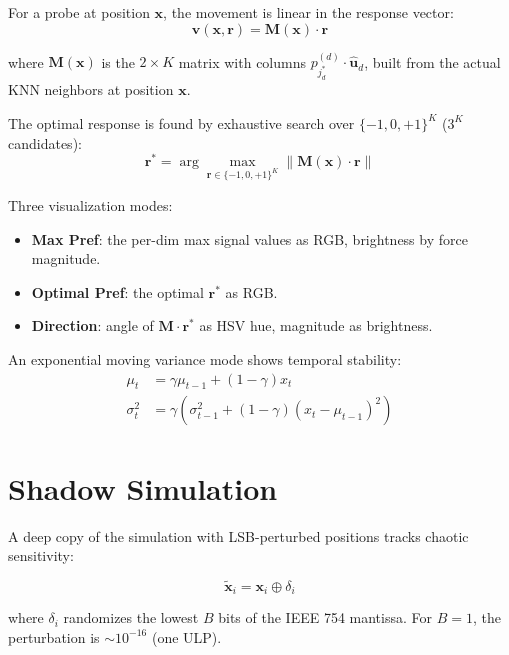 \documentclass[11pt,a4paper]{article}
\begin{document}
For a probe at position $\mathbf{x}$, the movement is linear in the response vector:
\begin{equation}
\mathbf{v}(\mathbf{x}, \mathbf{r}) = \mathbf{M}(\mathbf{x}) \cdot \mathbf{r}
\end{equation}

where $\mathbf{M}(\mathbf{x})$ is the $2 \times K$ matrix with columns $p_{j^*_d}^{(d)} \cdot \hat{\mathbf{u}}_d$, built from the actual KNN neighbors at position $\mathbf{x}$.

The optimal response is found by exhaustive search over $\{-1, 0, +1\}^K$ ($3^K$ candidates):
\begin{equation}
\mathbf{r}^* = \arg\max_{\mathbf{r} \in \{-1,0,+1\}^K} \|\mathbf{M}(\mathbf{x}) \cdot \mathbf{r}\|
\end{equation}

Three visualization modes:
\begin{itemize}[nosep]
\item \textbf{Max Pref}: the per-dim max signal values as RGB, brightness by force magnitude.
\item \textbf{Optimal Pref}: the optimal $\mathbf{r}^*$ as RGB.
\item \textbf{Direction}: angle of $\mathbf{M} \cdot \mathbf{r}^*$ as HSV hue, magnitude as brightness.
\end{itemize}

An exponential moving variance mode shows temporal stability:
\begin{align}
\mu_t &= \gamma \mu_{t-1} + (1 - \gamma) x_t \\
\sigma^2_t &= \gamma \left(\sigma^2_{t-1} + (1 - \gamma)(x_t - \mu_{t-1})^2\right)
\end{align}

\section{Shadow Simulation}

A deep copy of the simulation with LSB-perturbed positions tracks chaotic sensitivity:

\begin{equation}
\tilde{\mathbf{x}}_i = \mathbf{x}_i \oplus \delta_i
\end{equation}

where $\delta_i$ randomizes the lowest $B$ bits of the IEEE 754 mantissa. For $B = 1$, the perturbation is $\sim 10^{-16}$ (one ULP).
\end{document}
